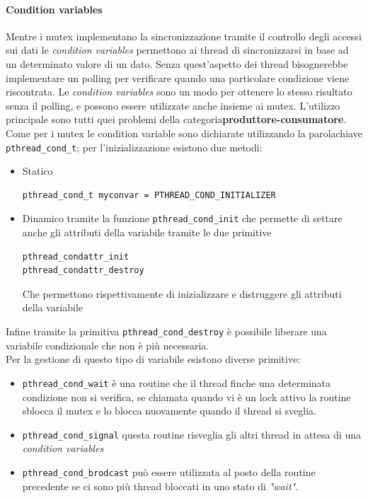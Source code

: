 \paragraph{Condition variables}
Mentre i mutex implementano la sincronizzazione tramite il controllo degli accessi sui dati le \emph{condition variables} permettono ai thread di sincronizzarsi in base ad un determinato valore di un dato. Senza quest'aspetto dei thread bisognerebbe implementare un polling per verificare quando una particolare condizione viene riscontrata. Le \emph{condition variables} sono un modo per ottenere lo stesso risultato senza il polling, e possono essere utilizzate anche insieme ai mutex.
L'utilizzo principale sono tutti quei problemi della categoria\textbf{produttore-consumatore}.\\
Come per i mutex le condition variable sono dichiarate utilizzando la parolachiave \texttt{pthread\_cond\_t}; per l'inizializzazione esistono due metodi:
\begin{itemize}
\item Statico
\begin{verbatim}
pthread_cond_t myconvar = PTHREAD_COND_INITIALIZER
\end{verbatim}
\item Dinamico tramite la funzione \texttt{pthread\_cond\_init} che permette di settare anche gli attributi della variabile tramite le due primitive
\begin{verbatim}
pthread_condattr_init
pthread_condattr_destroy
\end{verbatim}
Che permettono rispettivamente di inizializzare e distruggere gli attributi della variabile
\end{itemize}
Infine tramite la primitiva \texttt{pthread\_cond\_destroy} è possibile liberare una variabile condizionale che non è più necessaria.\\
Per la gestione di questo tipo di variabile esistono diverse primitive:
\begin{itemize}
\item \texttt{pthread\_cond\_wait} è una routine che il thread finche una determinata condizione non si verifica, se chiamata quando vi è un lock attivo la routine sblocca il mutex e lo blocca nuovamente quando il thread si sveglia.
\item \texttt{pthread\_cond\_signal} questa routine risveglia gli altri thread in attesa di una \emph{condition variables}
\item \texttt{pthread\_cond\_brodcast} può essere utilizzata al posto della routine precedente se ci sono più thread bloccati in uno stato di \emph{"wait"}.
\end{itemize}
